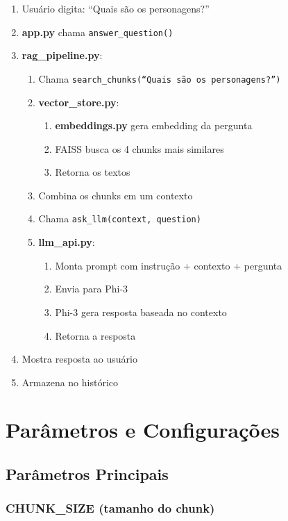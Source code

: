 \documentclass[12pt,a4paper]{article}
\begin{document}
\begin{enumerate}
    \item Usuário digita: ``Quais são os personagens?''
    \item \textbf{app.py} chama \texttt{answer\_question()}
    \item \textbf{rag\_pipeline.py}:
    \begin{enumerate}
        \item Chama \texttt{search\_chunks(``Quais são os personagens?'')}
        \item \textbf{vector\_store.py}:
        \begin{enumerate}
            \item \textbf{embeddings.py} gera embedding da pergunta
            \item FAISS busca os 4 chunks mais similares
            \item Retorna os textos
        \end{enumerate}
        \item Combina os chunks em um contexto
        \item Chama \texttt{ask\_llm(context, question)}
        \item \textbf{llm\_api.py}:
        \begin{enumerate}
            \item Monta prompt com instrução + contexto + pergunta
            \item Envia para Phi-3
            \item Phi-3 gera resposta baseada no contexto
            \item Retorna a resposta
        \end{enumerate}
    \end{enumerate}
    \item Mostra resposta ao usuário
    \item Armazena no histórico
\end{enumerate}

\section{Parâmetros e Configurações}

\subsection{Parâmetros Principais}

\subsubsection{CHUNK\_SIZE (tamanho do chunk)}
\end{document}

